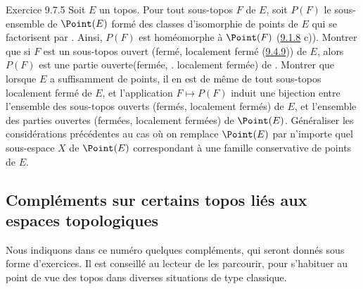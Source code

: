 \documentclass[10pt]{../fichiers-configuration-latex/smfart}
\begin{document}
\begin{enonce*}[remark]{Exercice 9.7.5}
Soit $E$ un topos. Pour tout sous-topos $F$ de $E$, soit $P(F)$ le
sous-ensemble de $\Point(E)$ formé des classes d'isomorphie de
points de $E$ qui se factorisent par . Ainsi, $P(F)$ est
homéomorphe à $\Point(F)$ (\hyperref[IV.exer9.1.8]{9.1.8} c)). Montrer que si
$F$ est un sous-topos ouvert (\resp fermé, \resp localement fermé
(\hyperref[IV.exer9.4.9]{9.4.9})) de $E$, alors $P(F)$ est une partie
ouverte\pageoriginale (\resp fermée, \resp. localement fermée) de
. Montrer que lorsque $E$ a suffisamment de points, il en est de
même de tout sous-topos localement fermé de $E$, et l'application
$F\mapsto P(F)$ induit une bijection entre l'ensemble des sous-topos
ouverts (\resp fermés, \resp localement fermés) de $E$, et
l'ensemble des parties ouvertes (\resp fermées, \resp localement
fermées) de $\Point(E)$. Généraliser les
considérations précédentes
au cas où on remplace $\Point(E)$ par n'importe quel sous-espace $X$
de $\Point(E)$ correspondant à une famille conservative de points de
$E$.
\end{enonce*}

\subsection{Compléments sur certains topos liés aux espaces topologiques}

Nous indiquons dans ce numéro quelques compléments, qui seront
donnés sous forme d'exercices. Il est conseillé au lecteur de les
parcourir, pour s'habituer au point de vue des topos dans diverses
situations de type classique.
\end{document}
